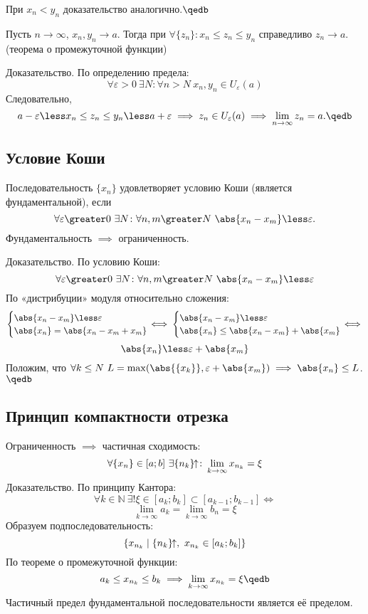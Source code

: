 При $x_n\less y_n$ доказательство аналогично.$\qedb$

Пусть $n\to\infty$, $x_n,y_n\to a$. Тогда при $\forall\{z_n\}\colon x_n\leq z_n\leq y_n$ 
справедливо $z_n\to a$. {\ital\color{desc}(теорема о промежуточной функции)}

{\bold Доказательство.} По определению предела:
$$\forall\varepsilon\greater 0\ \exists N\colon\forall n\greater N\ x_n,y_n\in U_
\varepsilon(a)$$
Следовательно,
$$a-\varepsilon\less x_n\leq z_n\leq y_n\less a+\varepsilon\implies z_n\in U_
\varepsilon(a)\implies\lim_{n\to\infty}z_n=a.\qedb$$

\subsection{Условие Коши}

Последовательность $\{x_n\}$ удовлетворяет {\ital условию Коши} {\ital\color{desc} 
(является фундаментальной)}, если
$$\forall\varepsilon\greater 0\ \exists N\colon\forall n,m\greater N\ \abs{x_n-x_m}\less
\varepsilon.$$
Фундаментальность $\implies$ ограниченность.

{\bold Доказательство.} По условию Коши:
$$\forall\varepsilon\greater 0\ \exists N\colon\forall n,m\greater N\ \abs{x_n-x_m}\less
\varepsilon$$
По «дистрибуции» модуля относительно сложения:
$$\begin{cases}
\abs{x_n-x_m}\less\varepsilon\\
\abs{x_n}=\abs{x_n-x_m+x_m}
\end{cases}\hspace*{-12pt}\iff
\begin{cases}
\abs{x_n-x_m}\less\varepsilon\\
\abs{x_n}\leq\abs{x_n-x_m}+\abs{x_m}
\end{cases}\hspace*{-12pt}\iff$$
$$\abs{x_n}\less\varepsilon+\abs{x_m}$$
Положим, что $\forall k\leq N\ L=\max(\abs{\{x_k\}},\varepsilon+\abs{x_m})\implies
\abs{x_n}\leq L$.$\qedb$

\subsection{Принцип компактности отрезка}

Ограниченность $\implies$ частичная сходимость:
$$\forall\{x_n\}\in[a;b]\ \exists\{n_k\}\kern-4pt\uparrow\colon\lim_{k\to\infty}x_{n_k}=
\xi$$
{\bold Доказательство.} По принципу Кантора:
$$\forall k\in\mathbb{N}\ \exists!\xi\in[a_k;b_k]\subset[a_{k-1};b_{k-1}]\iff$$
$$\lim_{k\to\infty}a_k=\lim_{k\to\infty}b_n=\xi$$
Образуем подпоследовательность:
$$\{x_{n_k}\mid \{n_k\}\kern-4pt\uparrow,\ x_{n_k}\in[a_k;b_k]\}$$
По теореме о промежуточной функции:
$$a_k\leq x_{n_k}\leq b_k\implies \lim_{k\to\infty}x_{n_k}=\xi\qedb$$
Частичный предел фундаментальной последовательности является её пределом.


